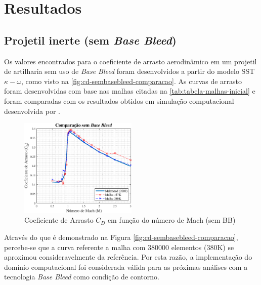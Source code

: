 \chapter{Resultados}\label{cap:resultados}
\graphicspath{{chapter-07/img-cap07/}}

\section{Projetil inerte (sem \textit{Base Bleed})}\label{sec:resultados-sem-basebleed}

Os valores encontrados para o coeficiente de arrasto aerodinâmico em um projetil de artilharia sem uso de \textit{Base Bleed} foram desenvolvidos a partir do modelo SST \(\kappa-\omega\), como visto na \autoref{fig:cd-sembasebleed-comparacao}. As curvas de arrasto foram desenvolvidas com base nas malhas citadas na \autoref{tab:tabela-malhas-inicial} e foram comparadas com os resultados obtidos em simulação computacional desenvolvida por \citeauthor{Mahmoud2009}. 

\begin{figure}[!ht]
	\centering
	\includegraphics[width=0.5\textwidth]{cd-sembasebleed-comparacao.eps}
	\caption{Coeficiente de Arrasto \(C_{D}\) em função do número de Mach (sem BB)}
	\label{fig:cd-sembasebleed-comparacao}
\end{figure}

Através do que é demonstrado na Figura \autoref{fig:cd-sembasebleed-comparacao}, percebe-se que a curva referente a malha com \num{380000} elementos (380K) se aproximou consideravelmente da referência. Por esta razão, a implementação do domínio computacional foi considerada válida para as próximas análises com a tecnologia \textit{Base Bleed} como condição de contorno.

